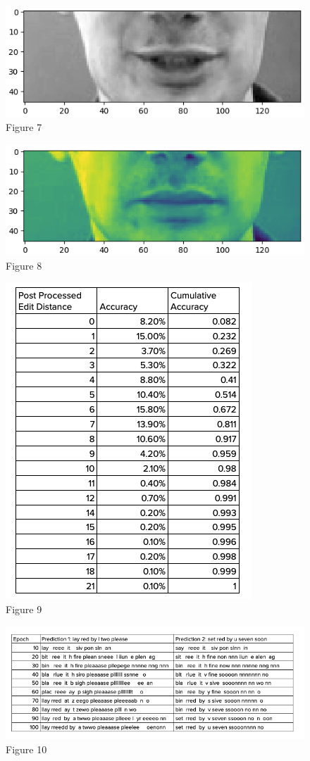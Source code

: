 \documentclass[
]{article}
\begin{document}
\begin{figure}
\centering
\includegraphics{"../Figures/Figure_7.png"}
\caption{Figure 7}
\end{figure}

\begin{figure}
\centering
\includegraphics{"../Figures/Figure_8.png"}
\caption{Figure 8}
\end{figure}

\begin{figure}
\centering
\includegraphics{"../Figures/Figure_9.png"}
\caption{Figure 9}
\end{figure}

\begin{figure}
\centering
\includegraphics{"../Figures/Figure_10.png"}
\caption{Figure 10}
\end{figure}
\end{document}
